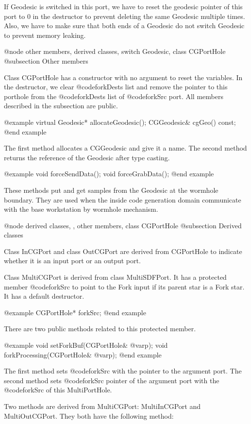 If Geodesic is switched in this port, we have to reset the geodesic
pointer of this port to 0 in the destructor to prevent deleting the
same Geodesic multiple times. Also, we have to make sure that
both ends of a Geodesic do not switch Geodesic to prevent memory leaking.

@node other members, derived classes, switch Geodesic, class CGPortHole
@subsection Other members

Class CGPortHole has a constructor with no argument to reset the variables.
In the destructor, we clear @code{forkDests} list and remove the pointer
to this porthole from the @code{forkDests} list of @code{forkSrc} port.
All members described in the subsection are public.

@example
virtual Geodesic* allocateGeodesic();
CGGeodesic& cgGeo() const;
@end example

The first method allocates a CGGeodesic and give it a name.
The second method returns the reference of the Geodesic after type casting.

@example
void forceSendData();
void forceGrabData();
@end example

These methods put and get samples from the Geodesic at the wormhole
boundary. They are used when the inside code generation domain
communicate with the base workstation by wormhole mechanism.

@node derived classes, , other members, class CGPortHole
@subsection Derived classes

Class InCGPort and class OutCGPort are derived from CGPortHole to indicate
whether it is an input port or an output port.

Class MultiCGPort is derived from class MultiSDFPort. It has a protected
member @code{forkSrc} to point to the Fork input if its parent star
is a Fork star. It has a default destructor.

@example
CGPortHole* forkSrc;
@end example

There are two public methods related to this protected member.

@example
void setForkBuf(CGPortHole& @var{p});
void forkProcessing(CGPortHole& @var{p});
@end example

The first method sets @code{forkSrc} with the pointer to the argument port.
The second method sets @code{forkSrc} pointer of the argument port with
the @code{forkSrc} of this MultiPortHole.

Two methods are derived from MultiCGPort: MultiInCGPort and MultiOutCGPort.
They both have the following method:

